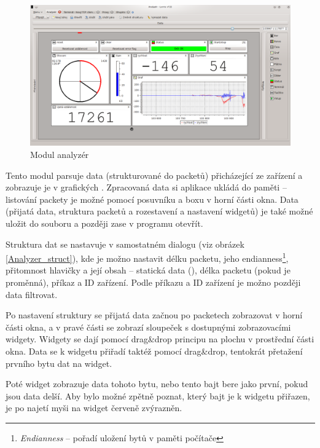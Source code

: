 \documentclass[12pt, a4paper, oneside]{article}
\newcommand{\It}{\textit}  %
\begin{document}
\begin{figure}[h]
\begin{center}
\includegraphics[width=\textwidth]{img/analyzer_all.png}
\caption{Modul analyzér}
\label{Analyzer}
\end{center}
\end{figure}

Tento modul parsuje data (strukturované do packetů) přicházející ze zařízení a zobrazuje je v grafických . Zpracovaná data si aplikace ukládá do paměti -- listování packety je možné pomocí posuvníku a boxu v horní části okna. Data (přijatá data, struktura packetů a rozestavení a nastavení widgetů) je také možné uložit do souboru a později zase v programu otevřít.

Struktura dat se nastavuje v samostatném dialogu (viz obrázek \ref{Analyzer_struct}), kde je možno nastavit délku packetu, jeho endianness\footnote{\It{Endianness} -- pořadí uložení bytů v paměti počítače}, přitomnost hlavičky a její obsah -- statická data (), délka packetu (pokud je proměnná), příkaz a ID zařízení. Podle příkazu a ID zařízení je možno později data filtrovat.

\newpage
\setlength{\voffset}{0mm} %
\pagestyle{plain}

Po nastavení struktury se přijatá data začnou po packetech zobrazovat v horní části okna, a v pravé části se zobrazí sloupeček s dostupnými zobrazovacími widgety. Widgety se dají pomocí drag\&drop principu  na plochu v prostřední části okna. Data se k widgetu přiřadí taktéž pomocí drag\&drop, tentokrát přetažení prvního bytu dat na widget. 

Poté widget zobrazuje data tohoto bytu, nebo tento bajt bere jako první, pokud jsou data delší. Aby bylo možné zpětně poznat, který bajt je k widgetu přiřazen, je po najetí myši na widget červeně zvýrazněn.
\end{document}
